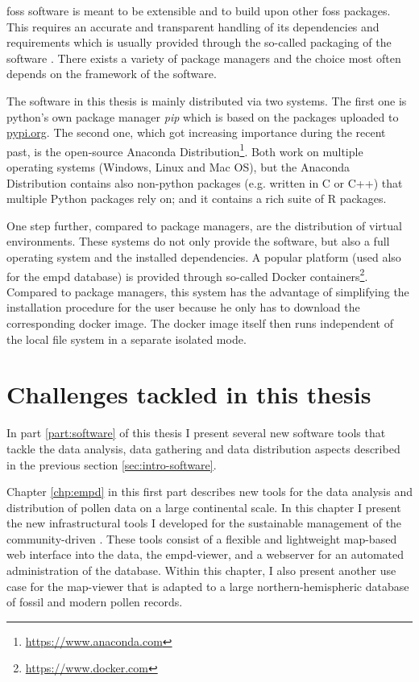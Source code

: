 \begin{refsection}
\gls{foss} software is meant to be extensible and to build upon other \gls{foss} packages. This requires an accurate and transparent handling of its dependencies and requirements which is usually provided through the so-called packaging of the software \citep[e.g.][]{Torborg2016}. There exists a variety of package managers and the choice most often depends on the framework of the software.

The software in this thesis is mainly distributed via two systems. The first one is python's own package manager \textit{pip} which is based on the packages uploaded to \href{https://pypi.org/}{pypi.org}. The second one, which got increasing importance during the recent past, is the open-source Anaconda Distribution\footnote{\url{https://www.anaconda.com}}. Both work on multiple operating systems (Windows, Linux and Mac OS), but the Anaconda Distribution contains also non-python packages (e.g. written in C or C++) that multiple Python packages rely on; and it contains a rich suite of R packages.

One step further, compared to package managers, are the distribution of virtual environments. These systems do not only provide the software, but also a full operating system and the installed dependencies. A popular platform (used also for the \gls{empd} database) is provided through so-called Docker containers\footnote{\url{https://www.docker.com}}. Compared to package managers, this system has the advantage of simplifying the installation procedure for the user because he only has to download the corresponding docker image. The docker image itself then runs independent of the local file system in a separate isolated mode.



\section{Challenges tackled in this thesis} \label{sec:intro-thesis-overview}

In part \ref{part:software} of this thesis I present several new software tools that tackle the data analysis, data gathering and data distribution aspects described in the previous section \ref{sec:intro-software}. 

Chapter \ref{chp:empd} in this first part describes new tools for the data analysis and distribution of pollen data on a large continental scale. In this chapter I present the new infrastructural tools I developed for the sustainable management of the community-driven . These tools consist of a flexible and lightweight map-based web interface into the data, the \acrshort{empd}-viewer, and a webserver for an automated administration of the database. Within this chapter, I also present another use case for the map-viewer that is adapted to a large northern-hemispheric database of fossil and modern pollen records.


\end{refsection}
